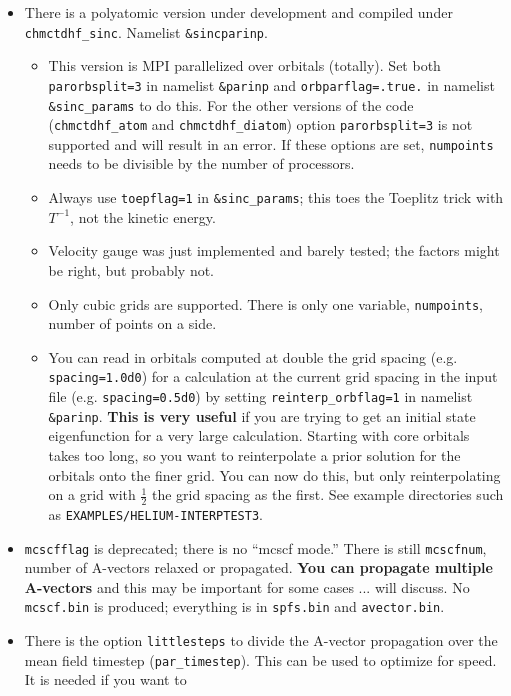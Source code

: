 \documentclass[10pt,leqno, oneside]{book}
\begin{document}
\begin{itemize}
%
\item{There is a polyatomic version under development and compiled under \verb#chmctdhf_sinc#.  Namelist \verb#&sincparinp#.
\begin{itemize}
\item{This version is MPI parallelized over orbitals (totally).  Set both \verb#parorbsplit=3# in namelist \verb#&parinp# and \verb#orbparflag=.true.# in 
namelist \verb#&sinc_params# to do this.  
For the other versions of the code (\verb#chmctdhf_atom# and \verb#chmctdhf_diatom#) option \verb#parorbsplit=3# is not
supported and will result in an error.  If these options are set, \verb#numpoints# needs to be divisible by the number of processors.}
\item{Always use \verb#toepflag=1# in
\verb#&sinc_params#; this toes the Toeplitz trick with $T^{-1}$, not the kinetic energy.}
\item{Velocity gauge was just implemented and barely tested; the factors might be right, but probably not.}
\item{Only cubic grids are supported.  There is only one variable, \verb#numpoints#, number of points on a side.}
\item{You can read in orbitals computed at double the grid spacing (e.g. \verb#spacing=1.0d0#) for a calculation at the current
grid spacing in the input file (e.g. \verb#spacing=0.5d0#) by setting \verb#reinterp_orbflag=1# in namelist \verb#&parinp#.  
\textbf{This is very useful} if you are trying to get an initial state eigenfunction for a very large calculation.  Starting with core orbitals
takes too long, so you want to reinterpolate a prior solution for the orbitals onto the finer grid.  You can now do this, but only reinterpolating
on a grid with $\frac{1}{2}$ the grid spacing as the first.  See example directories such as \verb#EXAMPLES/HELIUM-INTERPTEST3#.}
\end{itemize}
}
%
\item{\verb#mcscfflag# is deprecated; there is no ``mcscf mode.''  There is still \verb#mcscfnum#, number of A-vectors relaxed or propagated.  
\textbf{You can propagate multiple A-vectors} and this may be important for some cases ... will discuss.
No \verb#mcscf.bin# is produced; everything is in \verb#spfs.bin# and \verb#avector.bin#.}
%
\item{There is the option \verb#littlesteps# to divide the A-vector propagation over the mean field timestep (\verb#par_timestep#).  This can be used
to optimize for speed.  It is needed if you want to
}
\end{itemize}
\end{document}
